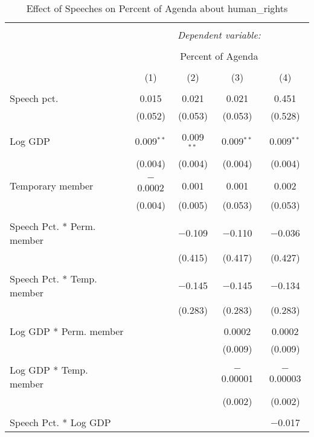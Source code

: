 
\begin{table}[!htbp] \centering 
  \caption{Effect of Speeches on Percent of Agenda about  human_rights} 
  \label{} 
\begin{tabular}{@{\extracolsep{5pt}}lcccc} 
\\[-1.8ex]\hline 
\hline \\[-1.8ex] 
 & \multicolumn{4}{c}{\textit{Dependent variable:}} \\ 
\cline{2-5} 
\\[-1.8ex] & \multicolumn{4}{c}{Percent of Agenda} \\ 
\\[-1.8ex] & (1) & (2) & (3) & (4)\\ 
\hline \\[-1.8ex] 
 Speech pct. & 0.015 & 0.021 & 0.021 & 0.451 \\ 
  & (0.052) & (0.053) & (0.053) & (0.528) \\ 
  & & & & \\ 
 Log GDP & 0.009$^{**}$ & 0.009$^{**}$ & 0.009$^{**}$ & 0.009$^{**}$ \\ 
  & (0.004) & (0.004) & (0.004) & (0.004) \\ 
  & & & & \\ 
 Temporary member & $-$0.0002 & 0.001 & 0.001 & 0.002 \\ 
  & (0.004) & (0.005) & (0.053) & (0.053) \\ 
  & & & & \\ 
 Speech Pct. * Perm. member &  & $-$0.109 & $-$0.110 & $-$0.036 \\ 
  &  & (0.415) & (0.417) & (0.427) \\ 
  & & & & \\ 
 Speech Pct. * Temp. member &  & $-$0.145 & $-$0.145 & $-$0.134 \\ 
  &  & (0.283) & (0.283) & (0.283) \\ 
  & & & & \\ 
 Log GDP * Perm. member &  &  & 0.0002 & 0.0002 \\ 
  &  &  & (0.009) & (0.009) \\ 
  & & & & \\ 
 Log GDP * Temp. member &  &  & $-$0.00001 & $-$0.00003 \\ 
  &  &  & (0.002) & (0.002) \\ 
  & & & & \\ 
 Speech Pct. * Log GDP &  &  &  & $-$0.017 \\ 

\end{tabular}
\end{table}
